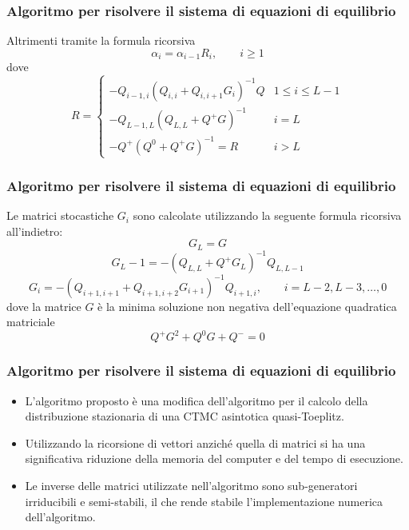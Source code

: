 \documentclass{beamer}
\begin{document}
\begin{frame}
    \frametitle{Algoritmo per risolvere il sistema di equazioni di equilibrio}
    \begin{theorem}
        Altrimenti tramite la formula ricorsiva
        \begin{equation*}\label{eq:rec-alpha}
            \alpha_i = \alpha_{i-1} R_i, \qquad i \geq 1
        \end{equation*}
        dove
        \begin{equation*}
            R =
            \begin{cases}
                -Q_{i-1,i}(Q_{i,i} + Q_{i,i+1}G_i)^{-1}Q & 1 \leq i \leq L-1 \\
                -Q_{L-1,L}(Q_{L,L} + Q^+G)^{-1} & i = L \\
                -Q^+(Q^0 + Q^+G)^{-1} = R & i>L
            \end{cases}
        \end{equation*}
    \end{theorem}
\end{frame}


\begin{frame}
    \frametitle{Algoritmo per risolvere il sistema di equazioni di equilibrio}
    \begin{theorem}
        Le matrici stocastiche $G_i$ sono calcolate utilizzando la seguente formula ricorsiva all'indietro:
                $$G_L = G$$
                $$G_L-1 = -(Q_{L,L} + Q^+G_L)^{-1}Q_{L,L-1}$$
                $$G_i = -(Q_{i+1,i+1} + Q_{i+1,i+2}G_{i+1})^{-1}Q_{i+1,i}, \qquad i = L-2, L-3, \dots, 0$$
        dove la matrice $G$ è la minima soluzione non negativa dell'equazione quadratica matriciale
        \begin{equation*}
            Q^+G^2 + Q^0G + Q^- = 0
        \end{equation*}
    \end{theorem}
\end{frame}


\begin{frame}
    \frametitle{Algoritmo per risolvere il sistema di equazioni di equilibrio}
    \begin{itemize}
        \item L'algoritmo proposto è una modifica dell'algoritmo per il calcolo della distribuzione stazionaria di una CTMC asintotica quasi-Toeplitz.
        \item Utilizzando la ricorsione di vettori anziché quella di matrici si ha una significativa riduzione della memoria del computer e del tempo di esecuzione.
        \item Le inverse delle matrici utilizzate nell'algoritmo sono sub-generatori irriducibili e semi-stabili, il che rende stabile l'implementazione numerica dell'algoritmo.
    \end{itemize}
\end{frame}
\end{document}
